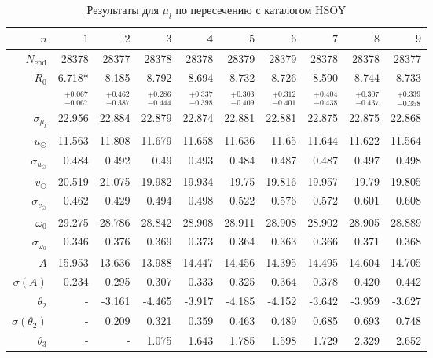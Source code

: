 \documentclass{matmex-diploma-custom}
\begin{document}
\pagebreak
\begin{table}[h!!]
\centering
\caption{Результаты для $\mu_l$ по пересечению с каталогом HSOY}
\begin{tabular}{r|rrr|r|rrrrr}
\hline
$n$ & $1$ & $2$ & $3$ & $\textbf{4}$ & $5$&$ 6 $&$ 7 $&$ 8 $&$ 9 $\\\hline
 $N_{\mathrm{end}}$ & 28378       &   28377 &   28378 &   28378 &   28379 &   28379 &   28378 &   28378 &   28377 \\
 $R_0 $& 6.718*      &   8.185 &   8.792 &   8.694 &   8.732 &   8.726 &    8.590 &   8.744 &   8.733 \\
       & $_{-0.067}^{+0.067} $ & $_{-0.387}^{+0.462}$ & $_{-0.444}^{+0.286}$   & $_{-0.398}^{+0.337}$  & $_{-0.409}^{+0.303}$  & $_{-0.401}^{+0.312}$  & $_{-0.438}^{+0.404}$  & $_{-0.437}^{+0.307}$  & $_{-0.358}^{+0.339}$  \\\hline
 $\sigma_{\mu_l} $& 22.956      &  22.884 &  22.879 &  22.874 &  22.881 &  22.881 &  22.875 &  22.875 &  22.868  \\ 
 $ u_{\odot} $& 11.563      &  11.808 &  11.679 &  11.658 &  11.636 &   11.65 &  11.644 &  11.622 &  11.564  \\
 $\sigma_{u_{\odot}} $&0.484       &   0.492 &    0.49 &   0.493 &   0.484 &   0.487 &   0.487 &   0.497 &   0.498  \\
 $v_{\odot} $& 20.519      &  21.075 &  19.982 &  19.934 &   19.75 &  19.816 &  19.957 &   19.79 &  19.805  \\
 $\sigma_{v_{\odot}}$&0.462       &   0.429 &   0.494 &   0.498 &   0.522 &   0.576 &   0.572 &   0.601 &   0.608  \\
 $\omega_0 $&29.275      &  28.786 &  28.842 &  28.908 &  28.911 &  28.908 &  28.902 &  28.905 &  28.889  \\
 $\sigma_{\omega_0} $& 0.346       &   0.376 &   0.369 &   0.373 &   0.364 &   0.363 &   0.366 &   0.371 &   0.368  \\\hline
 $A $&15.953      &  13.636 &  13.988 &  14.447 &  14.456 &  14.395 &  14.495 &  14.604 &  14.705  \\
 $\sigma(A) $ & 0.234       &   0.295 &   0.307 &   0.333 &   0.325 &   0.364 &   0.378 &    0.420 &   0.442  \\
 $\theta_2$&-        &  -3.161 &  -4.465 &  -3.917 &  -4.185 &  -4.152 &  -3.642 &  -3.959 &  -3.627  \\
 $\sigma(\theta_2)$&-      &    0.209 &   0.321 &   0.359 &   0.463 &   0.489 &   0.685 &   0.693 &   0.748  \\
 $\theta_3$&-      &    - &   1.075 &   1.643 &   1.785 &   1.598 &   1.729 &   2.329 &   2.652  \\

\end{tabular}
\end{table}
\end{document}
